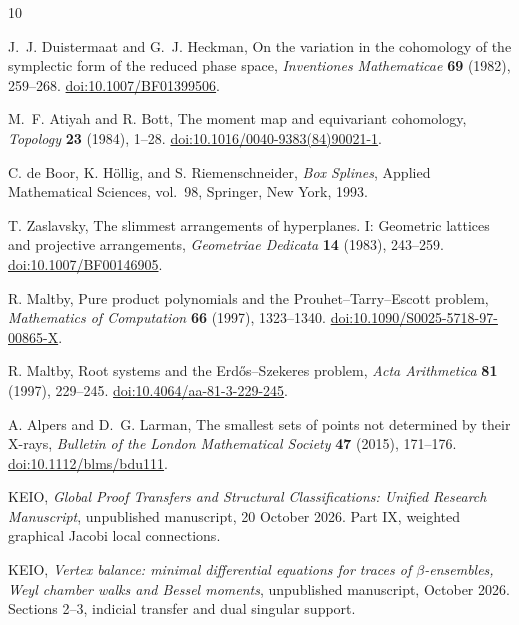 \documentclass[11pt]{article}
\theoremstyle{definition}
\theoremstyle{remark}
\numberwithin{equation}{section}
\begin{document}
\begin{thebibliography}{10}
\raggedright
{}
J.~J. Duistermaat and G.~J. Heckman,
On the variation in the cohomology of the symplectic form of the reduced
phase space,
\emph{Inventiones Mathematicae} \textbf{69} (1982), 259--268.
\href{https://doi.org/10.1007/BF01399506}{doi:10.1007/BF01399506}.

M.~F. Atiyah and R. Bott,
The moment map and equivariant cohomology,
\emph{Topology} \textbf{23} (1984), 1--28.
\href{https://doi.org/10.1016/0040-9383(84)90021-1}{doi:10.1016/0040-9383(84)90021-1}.

C. de Boor, K. H\"ollig, and S. Riemenschneider,
\emph{Box Splines}, Applied Mathematical Sciences, vol.~98,
Springer, New York, 1993.

T. Zaslavsky,
The slimmest arrangements of hyperplanes. I: Geometric lattices and
projective arrangements,
\emph{Geometriae Dedicata} \textbf{14} (1983), 243--259.
\href{https://doi.org/10.1007/BF00146905}{doi:10.1007/BF00146905}.

R. Maltby,
Pure product polynomials and the Prouhet--Tarry--Escott problem,
\emph{Mathematics of Computation} \textbf{66} (1997), 1323--1340.
\href{https://doi.org/10.1090/S0025-5718-97-00865-X}{doi:10.1090/S0025-5718-97-00865-X}.

R. Maltby,
Root systems and the Erd\H{o}s--Szekeres problem,
\emph{Acta Arithmetica} \textbf{81} (1997), 229--245.
\href{https://doi.org/10.4064/aa-81-3-229-245}{doi:10.4064/aa-81-3-229-245}.

A. Alpers and D.~G. Larman,
The smallest sets of points not determined by their X-rays,
\emph{Bulletin of the London Mathematical Society} \textbf{47}
(2015), 171--176.
\href{https://doi.org/10.1112/blms/bdu111}{doi:10.1112/blms/bdu111}.

KEIO,
\emph{Global Proof Transfers and Structural Classifications:
Unified Research Manuscript}, unpublished manuscript, 20 October 2026.
Part IX, weighted graphical Jacobi local connections.

KEIO,
\emph{Vertex balance: minimal differential equations for traces of
$\beta$-ensembles, Weyl chamber walks and Bessel moments},
unpublished manuscript, October 2026.
Sections 2--3, indicial transfer and dual singular support.
\end{thebibliography}
\end{document}
